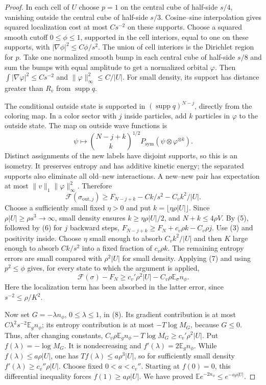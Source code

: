 \begin{proof}
In each cell of $U$ choose $p=1$ on the central cube of half-side
$s/4$, vanishing outside the central cube of half-side $s/3$.
Cosine--sine interpolation gives squared localization cost at most
$Cs^{-2}$ on these supports. Choose a squared smooth cutoff
$0\leq\phi\leq1$, supported in the cell interiors, equal to one
on these supports, with $|\nabla\phi|^2\leq C\phi/s^2$.
The union of cell interiors is the Dirichlet region for $p$.
Take one normalized smooth bump in each central cube of half-side
$s/8$ and sum the bumps with equal amplitude to get a normalized
orbital $\varphi$. Then
$\int|\nabla\varphi|^2\leq Cs^{-2}$ and
$\|\varphi\|_\infty^2\leq C/|U|$.
For small density, its support has distance greater than $R_v$
from $\operatorname{supp}q$.

The conditional outside state is supported in
$(\operatorname{supp}q)^{N-j}$, directly from the coloring map.
In a color sector with $j$ inside particles, add $k$ particles in
$\varphi$ to the outside state. The map on outside wave functions is
\[
 \psi\longmapsto
 \binom{N-j+k}{k}^{1/2}P_{\mathrm{sym}}
 (\psi\otimes\varphi^{\otimes k}).
\]
Distinct assignments of the new labels have disjoint supports, so
this is an isometry. It preserves entropy and has additive kinetic
energy; the separated supports also eliminate all old--new
interactions. A new--new pair has expectation at most
$\|v\|_1\|\varphi\|_\infty^2$. Therefore
\[
 \mathcal F(\sigma_{\mathrm{out},j})
 \geq F_{N-j+k}-Ck/s^2-C_vk^2/|U|.
\]
Choose a sufficiently small fixed $\eta>0$ and put
$k=\lfloor\eta\rho|U|\rfloor$.
Since $\rho|U|\geq\rho s^3\to\infty$, small density ensures
$k\geq\eta\rho|U|/2$, and $N+k\leq4\rho V$.
By (5), followed by (6) for $j$ backward steps,
$F_{N-j+k}\geq F_N+c_v\rho k-C_v\rho j$.
Use (3) and positivity inside. Choose $\eta$ small enough to absorb
$C_vk^2/|U|$ and then $K$ large enough to absorb $Ck/s^2$ into a
fixed fraction of $c_v\rho k$. The remaining entropy errors are
small compared with $\rho^2|U|$ for small density.
Applying (7) and using $p^2\leq\phi$ gives, for every state to
which the argument is applied,
\[
 \mathcal F(\sigma)-F_N
 \geq c_v'\rho^2|U|-C_v\rho\mathbb E_\sigma n_\phi.
\]
Here the localization term has been absorbed in the latter error,
since $s^{-2}\leq\rho/K^2$.

Now set $G=-\lambda n_\phi$, $0\leq\lambda\leq1$, in (8).
Its gradient contribution is at most
$C\lambda^2s^{-2}\mathbb E_gn_\phi$; its entropy contribution is
at most $-T\log M_G$, because $G\leq0$.
Thus, after changing constants,
$C_v\rho\mathbb E_g n_\phi-T\log M_G\geq c_v'\rho^2|U|$.
Put $f(\lambda)=-\log M_G$. It is nondecreasing and
$f'(\lambda)=2\mathbb E_gn_\phi$. While
$f(\lambda)\leq a\rho|U|$, one has
$Tf(\lambda)\leq a\rho^3|U|$, so for sufficiently small density
$f'(\lambda)\geq c_v''\rho|U|$. Choose fixed
$0<a<c_v''$. Starting at $f(0)=0$, this differential inequality
forces $f(1)\geq a\rho|U|$. We have proved
$\mathbb E e^{-2n_\phi}\leq e^{-a\rho|U|}$.


\end{proof}
